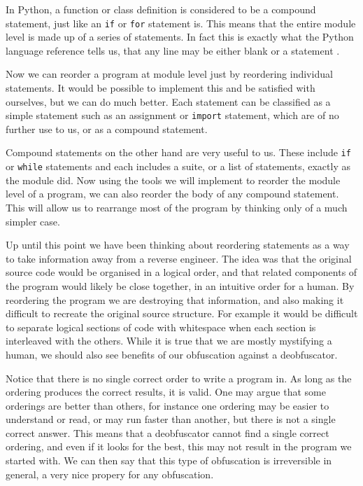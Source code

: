 \documentclass{report}
\begin{document}
In Python, a function or class definition is considered to be a compound statement, just like an \texttt{if} or \texttt{for} statement is. This
means that the entire module level is made up of a series of statements. In fact this is exactly what the Python language reference tells us, that
any line may be either blank or a statement \cite{fileformat}.

Now we can reorder a program at module level just by reordering individual statements. It would be possible to implement this and be satisfied with
ourselves, but we can do much better. Each statement can be classified as a simple statement such as an assignment or \texttt{import} statement,
which are of no further use to us, or as a compound statement.

Compound statements on the other hand are very useful to us. These include \texttt{if} or \texttt{while} statements and each includes a suite, or
a list of statements, exactly as the module did. Now using the tools we will implement to reorder the module level of a program, we can also reorder
the body of any compound statement. This will allow us to rearrange most of the program by thinking only of a much simpler case.

Up until this point we have been thinking about reordering statements as a way to take information away from a reverse engineer. The idea was that
the original source code would be organised in a logical order, and that related components of the program would likely be close together, in an intuitive
order for a human. By reordering the program we are destroying that information, and also making it difficult to recreate the original source structure. For
example it would be difficult to separate logical sections of code with whitespace when each section is interleaved with the others. While it is true that we
are mostly mystifying a human, we should also see benefits of our obfuscation against a deobfuscator.

Notice that there is no single correct order to write a program in. As long as the ordering produces the correct results, it is valid. One may argue that
some orderings are better than others, for instance one ordering may be easier to understand or read, or may run faster than another, but there is not
a single correct answer. This means that a deobfuscator cannot find a single correct ordering, and even if it looks for the best, this may not result in
the program we started with. We can then say that this type of obfuscation is irreversible in general, a very nice propery for any obfuscation. 
\end{document}
